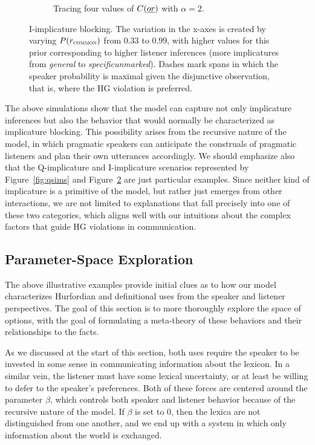 \documentclass[12pt,twoside]{article}
\newcommand{\figref}[1]{Figure~\ref{#1}}
\newcommand{\word}[1]{\emph{#1}}
\newcommand{\Costs}{C}
\newcommand{\Prior}{P}
\renewcommand{\_}{\textbf{\textunderscore\hspace{-4pt}\textunderscore\hspace{-3pt}\textunderscore\hspace{-4pt}\textunderscore}\hspace{0.5pt}}			%
\begin{document}
\begin{figure}[tp]
\begin{subfigure}{0.48\textwidth}
    \caption{Tracing four values of $\Costs(\word{or})$ with $\alpha=2$.}\label{fig:isims:or}
  \end{subfigure} 
  \caption{I-implicature blocking. The variation in the x-axes is
    created by varying $\Prior(r_{\textsc{common}})$ from $0.33$ to
    $0.99$, with higher values for this prior corresponding to higher
    listener inferences (more implicatures from \word{general} to
    \word{specific\_unmarked}).  Dashes mark spans in which the
    speaker probability is maximal given the disjunctive observation,
    that is, where the HG violation is preferred.}
  \label{fig:isims}
\end{figure}

The above simulations show that the model can capture not only
implicature inferences but also the behavior that would normally be
characterized as implicature blocking. This possibility arises from
the recursive nature of the model, in which pragmatic speakers can
anticipate the construals of pragmatic listeners and plan their own
utterances accordingly. We should emphasize also that the
Q-implicature and I-implicature scenarios represented by
\figref{fig:qsims} and \figref{fig:isims} are just particular
examples. Since neither kind of implicature is a primitive of the
model, but rather just emerges from other interactions, we are not
limited to explanations that fall precisely into one of these two
categories, which aligns well with our intuitions about the complex
factors that guide HG violations in communication.


\subsection{Parameter-Space Exploration}\label{sec:characterization}

The above illustrative examples provide initial clues as to how our
model characterizes Hurfordian and definitional uses from the speaker
and listener perspectives. The goal of this section is to more
thoroughly explore the space of options, with the goal of formulating
a meta-theory of these behaviors and their relationships to the facts.

As we discussed at the start of this section, both uses require the
speaker to be invested in some sense in communicating information
about the lexicon.  In a similar vein, the listener must have some
lexical uncertainty, or at least be willing to defer to the speaker's
preferences. Both of these forces are centered around the parameter
$\beta$, which controls both speaker and listener behavior because of
the recursive nature of the model. If $\beta$ is set to $0$, then the
lexica are not distinguished from one another, and we end up with a
system in which only information about the world is exchanged.
\end{document}
